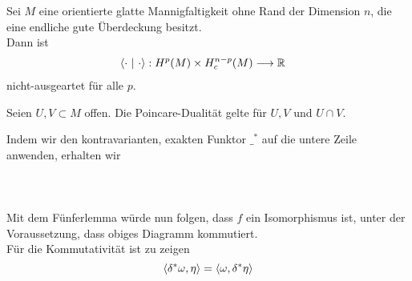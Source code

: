 Sei $M$ eine orientierte glatte Mannigfaltigkeit ohne Rand der Dimension $n$, die eine endliche gute Überdeckung besitzt.\\
Dann ist
\begin{align*}
\left<\cdot ~|~\cdot\right> :H^p(M) \times H^{n-p}_c(M) &\overset{}{\longrightarrow} \mathbb{R}
\end{align*}
nicht-ausgeartet für alle $p$.
\begin{Beweis}{}
Seien $U,V \subset M$ offen. Die Poincare-Dualität gelte für $U,V$ und $U\cap V$.
\begin{center}
\end{center}
Indem wir den kontravarianten, exakten Funktor $\_^*$ auf die untere Zeile anwenden, erhalten wir\\\\
\\\\
Mit dem Fünferlemma würde nun folgen, dass $f$ ein Isomorphismus ist, unter der Voraussetzung, dass obiges Diagramm kommutiert.\\
Für die Kommutativität ist zu zeigen
\[
\left<\delta^* \omega, \eta\right> = \left<\omega, \delta^* \eta\right>
\]
\end{Beweis}
